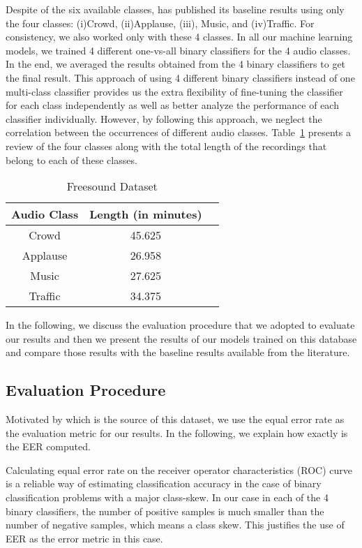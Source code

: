 Despite of the six available classes, \cite{kons2013audio} has published its baseline results using only the four classes: (i)Crowd, (ii)Applause, (iii), Music, and (iv)Traffic. For consistency, we also worked only with these 4 classes. In all our machine learning models, we trained 4 different one-vs-all binary classifiers for the 4 audio classes. In the end, we averaged the results obtained from the 4 binary classifiers to get the final result. This approach of using 4 different binary classifiers instead of one multi-class classifier provides us the extra flexibility of fine-tuning the classifier for each class independently as well as better analyze the performance of each classifier individually. However, by following this approach, we neglect the correlation between the occurrences of different audio classes. Table~\ref{tab:db2} presents a review of the four classes along with the total length of the recordings that belong to each of these classes. 

\begin{table}[tb]
\caption[Freesound dataset]{Freesound Dataset}
\label{tab:db2}
\centering
\begin{tabular}{ccc}
\toprule
Audio Class & Length (in minutes) \\ 
\midrule
Crowd	& 45.625 \\
Applause	& 26.958 \\
Music	& 27.625 \\
Traffic	& 34.375 \\
\bottomrule 
\end{tabular}
\end{table}

In the following, we discuss the evaluation procedure that we adopted to evaluate our results and then we present the results of our models trained on this database and compare those results with the baseline results available from the literature.

\subsection{Evaluation Procedure}
Motivated by \cite{kons2013audio} which is the source of this dataset, we use the equal error rate as the evaluation metric for our results. In the following, we explain how exactly is the EER computed. 

Calculating equal error rate on the receiver operator characteristics (ROC) curve \cite{bradley1997use} is a reliable way of estimating classification accuracy in the case of binary classification problems with a major class-skew. In our case in each of the 4 binary classifiers, the number of positive samples is much smaller than the number of negative samples, which means a class skew. This justifies the use of EER as the error metric in this case.

